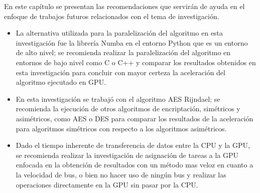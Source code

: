 \documentclass[../main/main.tex]{subfiles}
\begin{document}
\espacio
  En este capítulo se presentan las recomendaciones que servirán de ayuda en el enfoque de trabajos futuros relacionados con el tema de investigación.

  \begin{itemize}[noitemsep,nolistsep]
    \item La alternativa utilizada para la paralelización del algoritmo en esta investigación fue la librería Numba en el entorno Python que es un entorno de alto nivel; se recomienda realizar la paralelización del algoritmo en entornos de bajo nivel como C o C++ y comparar los resultados obtenidos en esta investigación para concluir con mayor certeza la aceleración del algoritmo ejecutado en GPU.
    \item En esta investigación se trabajó con el algoritmo AES Rijndael; se recomienda la ejecución de otros algoritmos de encriptación, simétricos y asimétricos, como AES o DES para comparar los resultados de la aceleración para algoritmos simétricos con respecto a los algoritmos asimétricos.
    \item Dado el tiempo inherente de transferencia de datos entre la CPU y la GPU, se recomienda realizar la investigación de asignación de tareas a la GPU enfocada en la obtención de resultados con un método mas veloz en cuanto a la velocidad de bus, o bien no hacer uso de ningún bus y realizar las operaciones directamente en la GPU sin pasar por la CPU.
  \end{itemize}
\end{document}
